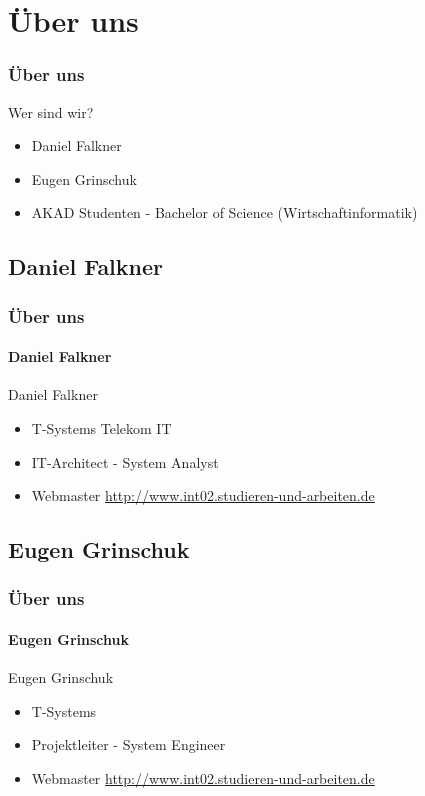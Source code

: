 \documentclass[xcolor=dvipsnames]{beamer}
\subtitle{Modul INT02} %
\institute{AKAD Pinneberg + Stuttgart} %
\title{\Title}
\author{\Author}
\date{\today}
\begin{document}
\begin{frame}
    \titlepage
\end{frame}


\frame{\tableofcontents[hideothersubsections]} 


\section{Über uns}
\begin{frame} %
  \frametitle{Über uns} %
  \begin{block}{Wer sind wir?}
	  \begin{itemize}
  		\item Daniel Falkner
	  	\item Eugen Grinschuk
	  	\item AKAD Studenten - Bachelor of Science (Wirtschaftinformatik)
	  \end{itemize}
  \end{block}
\end{frame}

\subsection{Daniel Falkner}
\begin{frame} %
  \frametitle{Über uns} %
  \framesubtitle{Daniel Falkner} %
  \begin{block}{Daniel Falkner}
	  \begin{itemize}
  		\item T-Systems Telekom IT
  		\item IT-Architect - System Analyst
 		\item Webmaster \url{http://www.int02.studieren-und-arbeiten.de}
	  \end{itemize}
  \end{block}
\end{frame}

\subsection{Eugen Grinschuk}
\begin{frame} %
  \frametitle{Über uns} %
  \framesubtitle{Eugen Grinschuk} %
  \begin{block}{Eugen Grinschuk}
	  \begin{itemize}
  		\item T-Systems
  		\item Projektleiter - System Engineer
  		\item Webmaster \url{http://www.int02.studieren-und-arbeiten.de}
	  \end{itemize}
  \end{block}
\end{frame}
\end{document}

